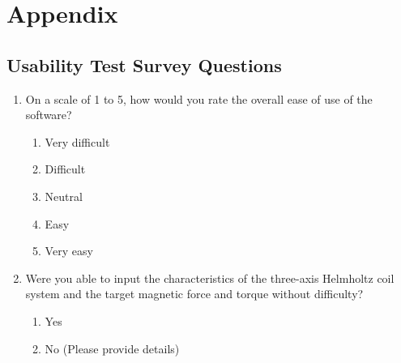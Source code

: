 \documentclass[12pt, titlepage]{article}
\begin{document}




\newpage

\section{Appendix}

\subsection{Usability Test Survey Questions}\label{subsec:UsabilitySurvery}
\begin{enumerate}
    \item On a scale of 1 to 5, how would you rate the overall ease of use of the software?
    \begin{enumerate}
        \item Very difficult
        \item Difficult
        \item Neutral
        \item Easy
        \item Very easy
    \end{enumerate}

    \item Were you able to input the characteristics of the three-axis Helmholtz coil system and the target magnetic force and torque without difficulty?
    \begin{enumerate}
        \item Yes
        \item No (Please provide details)
    \end{enumerate}


\end{enumerate}
\end{document}
